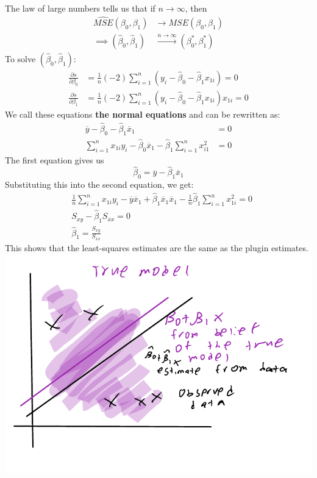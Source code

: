 \documentclass[12 pt]{article}
\begin{document}
The law of large numbers tells us that if $n \to \infty$, then
\begin{align*}
  \widehat{MSE}(\beta_0, \beta_1) & \to MSE(\beta_0, \beta_1)
  \\ \implies (\hat{\beta}_0, \hat{\beta}_1) & \stackrel{n \to \infty}{\to} (\beta_0^*, \beta_1^*)
\end{align*}
To solve $(\hat{\beta}_0, \hat{\beta}_1)$:
\begin{align*}
  \frac{\partial{s}}{\partial{\beta_0}} & = \frac{1}{n}(-2) \sum_{i=1}^n (y_i - \hat{\beta}_0 - \hat{\beta}_1x_{1i}) = 0
  \\ \frac{\partial{s}}{\partial{\beta_1}} & = \frac{1}{n}(-2) \sum_{i=1}^n (y_i - \hat{\beta}_0 - \hat{\beta}_1x_{1i})x_{1i} = 0
\end{align*}
We call these equations \textbf{the normal equations} and can be
rewritten as:
\begin{align*}
  \overline{y} - \hat{\beta}_0 - \hat{\beta}_1 \overline{x}_1 & = 0
  \\ \sum_{i=1}^nx_{1i}y_{i} - \hat{\beta}_0 \overline{x}_1 - \hat{\beta}_1 \sum_{i=1}^n x_{i1}^2 & = 0
\end{align*}
The first equation gives us $$\hat{\beta}_0 = \overline{y} -
\hat{\beta}_1 \overline{x}_1$$ Substituting this into the second equation, we get:
\begin{align*}
  & \frac{1}{n}\sum_{i=1}^nx_{1i}y_i - \overline{y}\overline{x}_1 + \hat{\beta}_1 \overline{x}_1 \overline{x}_1 - \frac{1}{n}\hat{\beta}_1 \sum_{i=1}^n x_{1i}^2 = 0
  \\ &S_{xy} - \hat{\beta}_1 S_{xx} = 0
  \\ &\hat{\beta}_1 = \frac{S_{xy}}{S_{xx}}
\end{align*}
This shows that the least-squares estimates are the same as the plugin
estimates.
\\ \includegraphics[width=.9\textwidth]{9.pdf}
\end{document}
